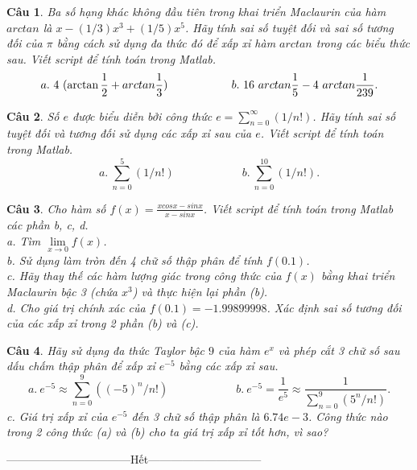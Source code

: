 \documentclass[answers]{exam}
\newtheorem{bt}{Câu}
\begin{document}
\begin{bt}
Ba số hạng khác không đầu tiên trong khai triển Maclaurin của hàm $arctan$ là $x - (1/3)x^3 + (1/5)x^5$. Hãy tính sai số tuyệt đối và sai số tương đối của $\pi$ bằng cách sử dụng đa thức đó để xấp xỉ hàm $arctan$ trong các biểu thức sau. Viết script để tính toán trong Matlab.
%
\begin{equation*} 
a.\ 4 \ (\arctan \frac{1}{2} + arctan \frac{1}{3}) \hskip 2cm b.\ 16 \ arctan \frac{1}{5} - 4 \ arctan \frac{1}{239}.
\end{equation*}
%
\end{bt}

\begin{bt}
Số $e$ được biểu diễn bởi công thức $e = \sum_{n=0}^{\infty}(1/n!)$. Hãy tính sai số tuyệt đối và tương đối sử dụng các xấp xỉ sau của $e$. Viết script để tính toán trong Matlab.
%
\[ 
a. \ \sum_{n=0}^{5}(1/n!) \qquad \qquad \qquad b. \ \sum_{n=0}^{10}(1/n!).
\] 
%
\end{bt}

\begin{bt}
Cho hàm số $f(x) = \frac{x cos x - sin x}{x - sin x}$. Viết script để tính toán trong Matlab các phần b, c, d.\\
a. Tìm $\underset{x \rightarrow 0}{\lim} f(x)$. \\
b. Sử dụng làm tròn đến 4 chữ số thập phân để tính $f(0.1)$. \\
c. Hãy thay thế các hàm lượng giác trong công thức của $f(x)$ bằng khai triển Maclaurin bậc 3 (chứa $x^3$) và thực hiện lại phần (b). \\
d. Cho giá trị chính xác của $f (0.1)=-1.99899998$. Xác định sai số tương đối của các xấp xỉ trong 2 phần (b) và (c).	
\end{bt}

\begin{bt}
Hãy sử dụng đa thức Taylor bậc $9$ của hàm $e^x$ và phép cắt 3 chữ số sau dấu chấm thập phân để xấp xỉ $e^{-5}$ bằng các xấp xỉ sau.
%
\[
a.\ e^{-5} \approx \sum_{n=0}^{9}((-5)^n/n!) \qquad \qquad \qquad b.\ e^{-5} = \frac{1}{e^5} \approx \frac{1}{\sum_{n=0}^{9}(5^n/n!)}. 
\]
%
c. Giá trị xấp xỉ của $e^{-5}$ đến 3 chữ số thập phân là $6.74e-3$. Công thức nào trong 2 công thức (a) và (b) cho ta giá trị xấp xỉ tốt hơn, vì sao?
\end{bt}

\centerline{———————————Hết——————————}

% 
   
\end{document}

